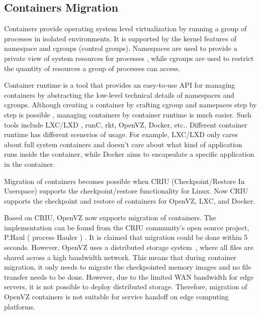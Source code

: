 \subsection{Containers Migration}

Containers provide operating system level virtualization by running a group of processes in isolated environments. It is supported by the kernel features of namespace 
 and cgroups (control groups)\cite{rosen2014container}.
Namespaces are used to provide a private view of system resources for processes \cite{pike1992plan9}, while cgroups are used to restrict the quantity of resources a group of processes can access\cite{rosen2013namespaceIntro}.  


Container runtime is a tool that provides an easy-to-use API for managing containers by abstracting the low-level technical details of namespaces and cgroups. 
Although creating a container by crafting cgroup and namepaces step by step is possible \cite{conScratch}, managing containers by container runtime is much easier.  Such tools include LXC/LXD\cite{LXC} ,
runC\cite{runc},
rkt\cite{rkt}, 
OpenVZ\cite{openvz}, 
Docker\cite{docker}, etc.. Different container runtime has different scenerios of usage. For example, LXC/LXD only cares about full system containers and doesn't care about what kind of application runs inside the container, while Docker aims to encapsulate a specific application in the container.  

Migration of containers becomes possible when CRIU (Checkpoint/Restore In Userspace)\cite{criu} supports the checkpoint/restore functionality for Linux. 
Now CRIU supports the checkpoint and restore of containers for OpenVZ, LXC, and Docker. 


Based on CRIU, OpenVZ now supports migration of containers. The implementation can be found from the CRIU community's open source project, P.Haul ( process Hauler ) \cite{phaul}.  It is claimed that migration could be done within 5 seconds\cite{livmigcon}.
However, OpenVZ uses a distributed storage system~\cite{openvzfs}, where all files are shared across a high bandwidth network. 
This means that during container migration, it only needs to migrate the checkpointed memory images and no file transfer needs to be done. 
However, due to the limited WAN bandwidth for edge servers, it is not possible to deploy distributed storage. Therefore, migration of OpenVZ containers is not suitable for service handoff on edge computing platforms.

